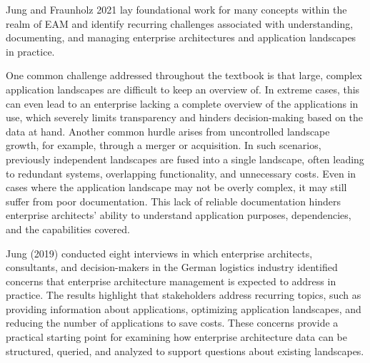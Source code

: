 Jung and Fraunholz 2021 \cite{jung2021masterclass} lay foundational work for many concepts within the realm of EAM and identify recurring challenges associated with understanding, documenting, and managing enterprise architectures and application landscapes in practice.

One common challenge addressed throughout the textbook is that large, complex application landscapes are difficult to keep an overview of. In extreme cases, this can even lead to an enterprise lacking a complete overview of the applications in use, which severely limits transparency and hinders decision-making based on the data at hand. Another common hurdle arises from uncontrolled landscape growth, for example, through a merger or acquisition. In such scenarios, previously independent landscapes are fused into a single landscape, often leading to redundant systems, overlapping functionality, and unnecessary costs. Even in cases where the application landscape may not be overly complex, it may still suffer from poor documentation. This lack of reliable documentation hinders enterprise architects' ability to understand application purposes, dependencies, and the capabilities covered.




Jung (2019) \cite{jung2019purpose} conducted eight interviews in which enterprise architects, consultants, and decision-makers in the German logistics industry identified concerns that  enterprise architecture management is expected to address in practice. The results highlight that stakeholders address recurring topics, such as providing information about applications, optimizing application landscapes, and reducing the number of applications to save costs. These concerns provide a practical starting point for examining how enterprise architecture data can be structured, queried, and analyzed to support questions about existing landscapes.



